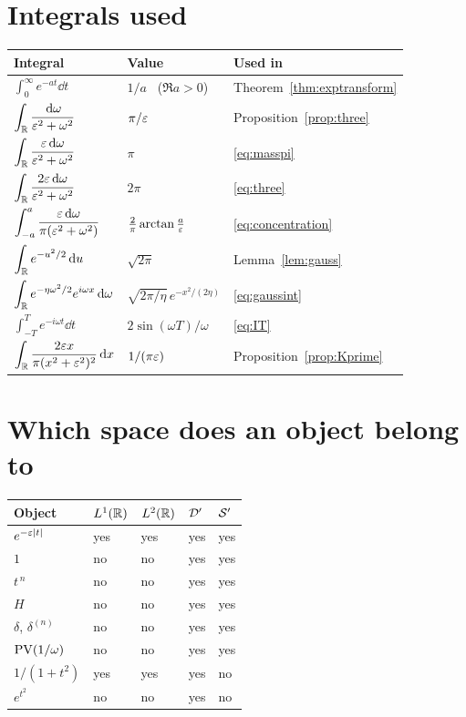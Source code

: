 \section{Integrals used}

\begin{center}
\small
\begin{tabular}{@{}lll@{}}
\toprule
Integral & Value & Used in \\
\midrule
$\displaystyle\int_{0}^{\infty}e^{-at}\dd t$ & $1/a$ \ ($\Re a>0$) & Theorem~\ref{thm:exptransform} \\
$\displaystyle\int_{\mathbb{R}}\frac{\,\mathrm{d}\omega}{\varepsilon^{2}+\omega^{2}}$ & $\pi/\varepsilon$ & Proposition~\ref{prop:three} \\
$\displaystyle\int_{\mathbb{R}}\frac{\varepsilon\,\mathrm{d}\omega}{\varepsilon^{2}+\omega^{2}}$ & $\pi$ & \eqref{eq:masspi} \\
$\displaystyle\int_{\mathbb{R}}\frac{2\varepsilon\,\mathrm{d}\omega}{\varepsilon^{2}+\omega^{2}}$ & $2\pi$ & \eqref{eq:three} \\
$\displaystyle\int_{-a}^{a}\frac{\varepsilon\,\mathrm{d}\omega}{\pi(\varepsilon^{2}+\omega^{2})}$ &
$\frac{2}{\pi}\arctan\frac{a}{\varepsilon}$ & \eqref{eq:concentration} \\
$\displaystyle\int_{\mathbb{R}}e^{-u^{2}/2}\,\mathrm{d} u$ & $\sqrt{2\pi}$ & Lemma~\ref{lem:gauss} \\
$\displaystyle\int_{\mathbb{R}}e^{-\eta\omega^{2}/2}e^{i\omega x}\,\mathrm{d}\omega$ &
$\sqrt{2\pi/\eta}\,e^{-x^{2}/(2\eta)}$ & \eqref{eq:gaussint} \\
$\displaystyle\int_{-T}^{T}e^{-i\omega t}\dd t$ & $2\sin(\omega T)/\omega$ & \eqref{eq:IT} \\
$\displaystyle\int_{\mathbb{R}}\frac{2\varepsilon x}{\pi(x^{2}+\varepsilon^{2})^{2}}\,\mathrm{d} x$ & $1/(\pi\varepsilon)$ & Proposition~\ref{prop:Kprime} \\
\bottomrule
\end{tabular}
\end{center}

\section{Which space does an object belong to}

\begin{center}
\small
\begin{tabular}{@{}lllll@{}}
\toprule
Object & $L^{1}(\mathbb{R})$ & $L^{2}(\mathbb{R})$ & $\mathcal{D}'$ & $\mathcal{S}'$ \\
\midrule
$e^{-\varepsilon|t|}$ & yes & yes & yes & yes \\
$1$ & no & no & yes & yes \\
$t^{\,n}$ & no & no & yes & yes \\
$H$ & no & no & yes & yes \\
$\delta$, $\delta^{(n)}$ & no & no & yes & yes \\
$\operatorname{PV}(1/\omega)$ & no & no & yes & yes \\
$1/(1+t^{2})$ & yes & yes & yes & no \\
$e^{t^{2}}$ & no & no & yes & no \\
\bottomrule
\end{tabular}
\end{center}

